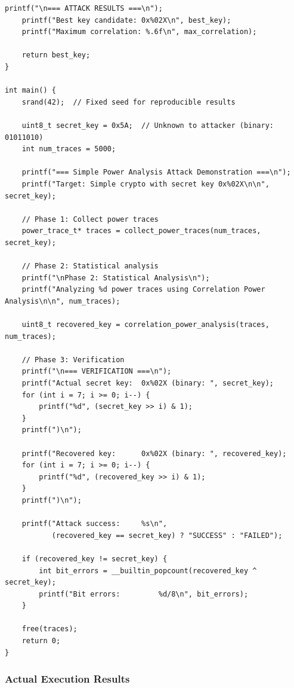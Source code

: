\documentclass[11pt,a4paper]{article}
\theoremstyle{definition}
\begin{document}
\begin{lstlisting}[caption={Complete Power Analysis Attack Implementation}]
    printf("\n=== ATTACK RESULTS ===\n");
    printf("Best key candidate: 0x%02X\n", best_key);
    printf("Maximum correlation: %.6f\n", max_correlation);
    
    return best_key;
}

int main() {
    srand(42);  // Fixed seed for reproducible results
    
    uint8_t secret_key = 0x5A;  // Unknown to attacker (binary: 01011010)
    int num_traces = 5000;
    
    printf("=== Simple Power Analysis Attack Demonstration ===\n");
    printf("Target: Simple crypto with secret key 0x%02X\n\n", secret_key);
    
    // Phase 1: Collect power traces
    power_trace_t* traces = collect_power_traces(num_traces, secret_key);
    
    // Phase 2: Statistical analysis
    printf("\nPhase 2: Statistical Analysis\n");
    printf("Analyzing %d power traces using Correlation Power Analysis\n\n", num_traces);
    
    uint8_t recovered_key = correlation_power_analysis(traces, num_traces);
    
    // Phase 3: Verification
    printf("\n=== VERIFICATION ===\n");
    printf("Actual secret key:  0x%02X (binary: ", secret_key);
    for (int i = 7; i >= 0; i--) {
        printf("%d", (secret_key >> i) & 1);
    }
    printf(")\n");
    
    printf("Recovered key:      0x%02X (binary: ", recovered_key);
    for (int i = 7; i >= 0; i--) {
        printf("%d", (recovered_key >> i) & 1);
    }
    printf(")\n");
    
    printf("Attack success:     %s\n", 
           (recovered_key == secret_key) ? "SUCCESS" : "FAILED");
    
    if (recovered_key != secret_key) {
        int bit_errors = __builtin_popcount(recovered_key ^ secret_key);
        printf("Bit errors:         %d/8\n", bit_errors);
    }
    
    free(traces);
    return 0;
}
\end{lstlisting}

\subsubsection{Actual Execution Results}
\end{document}
